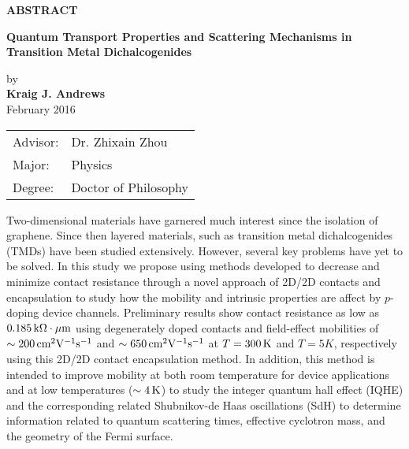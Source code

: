 \begin{center}
\textbf{ABSTRACT}
	
	
	\singlespacing
\textbf{Quantum Transport Properties and Scattering Mechanisms in Transition Metal Dichalcogenides}\\
	\doublespacing
	
	by\\
	
	\textbf{Kraig J. Andrews}\\
	February 2016\\
\end{center}
\begin{tabular}{ll}	
Advisor: &Dr. Zhixain Zhou\\
Major:   &Physics\\
Degree:  &Doctor of Philosophy
\end{tabular}
\bigskip

\noindent Two-dimensional materials have garnered much interest since the isolation of graphene. Since then layered materials, such as transition metal dichalcogenides (TMDs) have been studied extensively. However, several key problems have yet to be solved. In this study we propose using methods developed to decrease and minimize contact resistance through a novel approach of 2D/2D contacts and \hbn encapsulation to study how the mobility and intrinsic properties are affect by $p$-doping  device channels. Preliminary results show contact resistance as low as $0.185\,\mathrm{k\Omega\cdot\mu m}$ using degenerately doped contacts and field-effect mobilities of $\sim 200\,\mathrm{cm}^{2}\mathrm{V}^{-1}\mathrm{s}^{-1}$ and $\sim 650\,\mathrm{cm}^{2}\mathrm{V}^{-1}\mathrm{s}^{-1}$ at $T=300\,\mathrm{K}$ and $T=5{K}$, respectively using this 2D/2D contact \hbn encapsulation method. In addition, this method is intended to improve mobility at both room temperature for device applications and at low temperatures ($\sim 4\,\mathrm{K}$) to study the integer quantum hall effect (IQHE) and the corresponding related Shubnikov-de Haas oscillations (SdH) to determine information related to quantum scattering times, effective cyclotron mass, and the geometry of the Fermi surface. 
